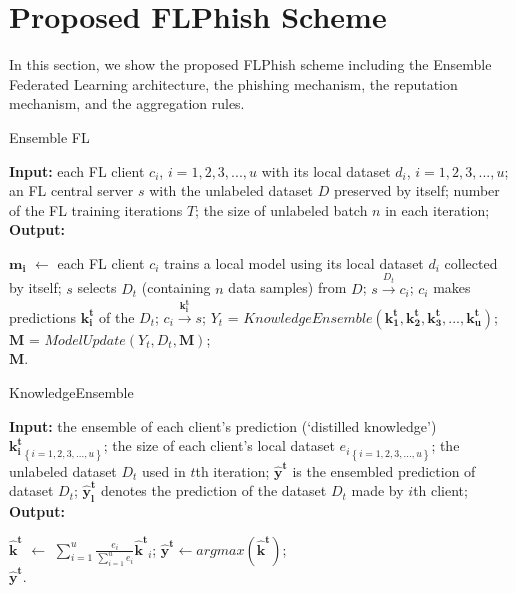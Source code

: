 \documentclass[journal]{IEEEtran}
\begin{document}
\section{Proposed FLPhish Scheme}
In this section, we show the proposed FLPhish scheme including the Ensemble Federated Learning architecture, the phishing mechanism, the reputation mechanism, and the aggregation rules.

\begin{algorithm}[t]
  \caption{Ensemble FL} %
  \label{alg:system}
  \hspace*{0.02in} {\bf Input:} %
  each FL client $c_i$, $i=1,2,3,...,u$ with its local dataset $d_i$, $i=1,2,3,...,u$; an FL central server $s$ with the unlabeled dataset $D$ preserved by itself; number of the FL training iterations $T$; the size of unlabeled batch $n$ in each iteration;\\
  \hspace*{0.02in} {\bf Output:} %
  \begin{algorithmic}[1]
    \State $\mathbf{m_i}$ $\gets$ each FL client $c_i$ trains a local model using its local dataset $d_i$ collected by itself;
      \State $s$ selects $D_t$ (containing $n$ data samples) from $D$;
        \State $s \overset{D_{t}}{\rightarrow} c_{i}$;
        \State $c_i$ makes predictions $\mathbf{k_i^t}$ of the $D_t$;
        \State $c_i \overset{\mathbf{k_i^t}}{\rightarrow} s$;
      \EndFor
      \State $Y_t$ = $KnowledgeEnsemble(\mathbf{k_1^t},\mathbf{k_2^t},\mathbf{k_3^t},...,\mathbf{k_u^t})$;
      \State $\mathbf{M}$ = $ModelUpdate(Y_t, D_t, \mathbf{M})$;
    \EndFor \\
    \Return $\mathbf{M}$.
  \end{algorithmic}
\end{algorithm}

\begin{algorithm}[t]
  \caption{KnowledgeEnsemble} %
  \label{alg:KnowledgeEnsemble}
  \hspace*{0.02in} {\bf Input:} %
  the ensemble of each client's prediction (`distilled knowledge') ${\mathbf{k_i^t}}_{\left \{ i= 1,2,3,...,u \right \}}$; the size of each client's local dataset ${e_i}_{\left \{ i= 1,2,3,...,u \right \}}$; the unlabeled dataset $D_t$ used in $t$th iteration; $\mathbf{\hat{y}^t}$ is the ensembled prediction of dataset $D_t$; $\mathbf{\hat{y}^t_l}$ denotes the prediction of the dataset $D_t$ made by $i$th client;\\
  \hspace*{0.02in} {\bf Output:} %
  \begin{algorithmic}[1]
      \State $\mathbf{\hat{k}^t}$ $\gets$ $\sum_{i=1}^{u}\frac{e_i}{\sum_{i=1}^{u}e_i}\mathbf{\hat{k}^t}_i$;
      \State $\mathbf{\hat{y}^t}\gets argmax(\mathbf{\hat{k}^t})$;
    \EndFor \\
    \Return $\mathbf{\hat{y}^t}$.
  \end{algorithmic}

\end{algorithm}
\end{document}
